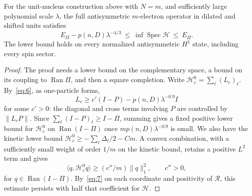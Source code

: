 \begin{proposition}\label{prop:complement}
For the unit-nucleus construction above with $N=m$, and sufficiently
large polynomial scale $\lambda$, the full antisymmetric $m$-electron
operator in dilated and shifted units satisfies
\[
                 E_\Pi-p(n,D)\lambda^{-4/3}
                   \ \le\ \inf\operatorname{Spec}\mathcal H\ \le\ E_\Pi.       \tag{8}\label{eq:8}
\]
The lower bound holds on every normalized antisymmetric $H^1$ state,
including every spin sector.
\end{proposition}

\begin{proof}
The proof needs a lower bound on the complementary space, a bound on
its coupling to $\operatorname{Ran}\Pi$, and then a square completion.
Write $\mathcal H_c^0=\sum_\ell (L_c)_\ell$. By~\eqref{eq:6}, as
one-particle forms,
\[
                L_c\ge c'(I-P)-p(n,D)\lambda^{-0.9} I
\]
for some $c'>0$: the diagonal and cross terms involving $P$ are
controlled by $\|L_cP\|$. Since
$\sum_\ell(I-P)_\ell\ge I-\Pi$, summing gives a fixed positive lower
bound for $\mathcal H_c^0$ on $\operatorname{Ran}(I-\Pi)$ once
$m p(n,D)\lambda^{-0.9}$ is small. We also have the kinetic lower bound
$\mathcal H_c^0\ge-\sum_\ell\Delta_\ell/2-Cm$. A convex combination,
with a sufficiently small weight of order $1/m$ on the kinetic bound,
retains a positive $L^2$ term and gives
\[
                 \langle q,\mathcal H_c^0 q\rangle
                    \ge (c''/m)\|q\|_1^2,\qquad c''>0,
\]
for $q\in\operatorname{Ran}(I-\Pi)$. By~\eqref{eq:7} on each
coordinate and positivity of $\mathcal R$, this estimate persists with
half that coefficient for $\mathcal H$.


\end{proof}
